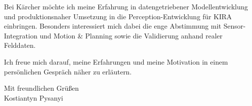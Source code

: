\documentclass[11pt,a4paper]{article}
\begin{document}
Bei Kärcher möchte ich meine Erfahrung in datengetriebener Modellentwicklung und produktionsnaher Umsetzung in die Perception-Entwicklung für KIRA einbringen. Besonders interessiert mich dabei die enge Abstimmung mit Sensor-Integration und Motion \& Planning sowie die Validierung anhand realer Felddaten.

Ich freue mich darauf, meine Erfahrungen und meine Motivation in einem persönlichen Gespräch näher zu erläutern.

Mit freundlichen Grüßen\\[0.8em]
Kostiantyn Pysanyi
\end{document}
